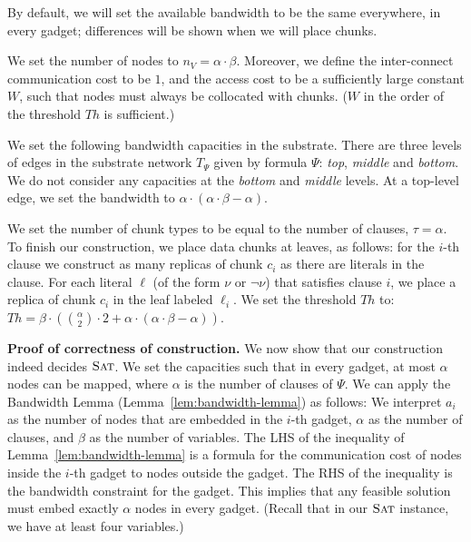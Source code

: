 \documentclass[9pt]{sigcomm-alternate}
\newcommand{\maciek}[1]{\textcolor{brown}{maciek: #1}}
\newcommand{\variab}{\nu}
\newcommand{\clauses}{\alpha}
\newcommand{\variables}{\beta}
\newcommand{\achunk}{\ensuremath{c}}
\newcommand{\Tree}{\ensuremath{T}}
\newcommand{\Vms}{\ensuremath{n_V}}
\newcommand{\SAT}{\textsc{Sat}}
\newcommand{\Formula}{\ensuremath{\Psi}}
\newcommand{\Thr}{\ensuremath{Th}}
\begin{document}
\begin{appendix}
By default, we will set the available
bandwidth to be the
same everywhere, in every gadget; differences will be shown when we
will place chunks.

We set the number of nodes to $\Vms = \clauses \cdot \variables$.
Moreover, we define the inter-connect communication cost to be $1$,
and the access cost to be a sufficiently large constant $W$,
such that nodes must always be collocated with chunks. ($W$ in the order of
the threshold $\Thr$ is sufficient.)

We set the following bandwidth capacities in the substrate. There are three
levels of edges in the substrate network $\Tree_{\Formula}$ given by formula
$\Formula$: \emph{top}, \emph{middle} and \emph{bottom}.
We do not consider any capacities at the \emph{bottom} and \emph{middle} levels.
At a top-level edge, we set the bandwidth to $\clauses \cdot (\clauses
\cdot \variables -
\clauses)$.

We set the number of chunk types to be equal to the number of clauses, $\tau =
\clauses$. To finish our construction, we place data chunks at
leaves, as follows: for the $i$-th clause we
construct as many replicas of chunk $\achunk_i$ as there are literals in the
clause. For each literal $\ell$ (of the form $\variab$ or $\neg \variab$) that satisfies clause $i$,
 we place
a replica of chunk $\achunk_i$ in the leaf labeled $\ell_i$.
We set the threshold $\Thr$ to:
$ \Thr = \variables \cdot ({\clauses  \choose 2} \cdot 2 +
\clauses \cdot (\clauses
\cdot \variables - \clauses))$.

\textbf{Proof of correctness of construction.}
We now show that our construction indeed
decides $\SAT$. We set the capacities such that in every gadget,
at most $\clauses$ nodes can be mapped, where $\clauses$
is the number of clauses of $\Formula$.
We can apply the Bandwidth Lemma (Lemma~\ref{lem:bandwidth-lemma}) as follows:
We interpret $a_i$ as the
number of nodes that are embedded in the $i$-th gadget, $\clauses$
as the number
of clauses, and $\variables$ as the number of variables.
The LHS of the inequality of Lemma~\ref{lem:bandwidth-lemma}
is a formula for the communication cost of nodes inside the $i$-th
gadget to nodes outside the gadget. The RHS of the inequality is the
bandwidth constraint for the gadget. This implies that
any feasible solution must embed exactly $\clauses$ nodes in every gadget.
(Recall that in our $\SAT$ instance, we have at least four variables.)


\end{appendix}
\end{document}
